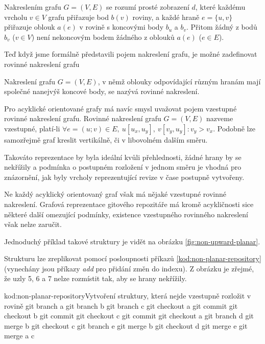 \documentclass[
  biblatex,
  glossaries,
  index
]{kidiplom}
\begin{document}
\begin{definition}
Nakreslením grafu $G=(V,E)$ se rozumí prosté zobrazení $d$, které každému vrcholu $v\in V$ grafu přiřazuje bod $b(v)$ roviny, a každé hraně $e=\{u,v\}$ přiřazuje oblouk $a(e)$ v rovině s koncovými body $b_u$ a $b_v$. Přitom žádný z bodů $b_v$ ($v\in V$) není
nekoncovým bodem žádného z oblouků $a(e)$ ($e\in E$).

Teď když jsme formálně představili pojem nakreslení grafu, je možné zadefinovat rovinné nakreslení grafu

\end{definition}
Nakreslení grafu $G = (V,E)$, v němž oblouky odpovídající různým hranám mají
společné nanejvýš koncové body, se nazývá rovinné nakreslení.
\begin{definition}

Pro acyklické orientované grafy má navíc smysl uvažovat pojem vzestupné rovinné nakreslení grafu. Rovinné nakreslení grafu $G=(V,E)$ nazveme vzestupné, platí-li $\forall e=(u; v)\in E,\ u[u_x,u_y],\ v[v_y,u_y]\colon v_y > v_x$. Podobně lze samozřejmě graf kreslit vertikálně, či v libovolném dalším směru.
\end{definition}

Takováto reprezentace by byla ideální kvůli přehlednosti, žádné hrany by se nekřížily a podmínka o postupném rozložení v jednom směru je vhodná pro znázornění, jak byly vrcholy reprezentující revize v čase postupně vytvořeny.

Ne každý acyklický orientovaný graf však má nějaké vzestupné rovinné nakreslení. Grafová reprezentace gitového repozitáře má kromě acykličnosti sice některé další omezující podmínky, existence vzestupného rovinného nakreslení však nelze zaručit.

Jednoduchý příklad takové struktury je vidět na obrázku \ref{fig:non-upward-planar}.

Strukturu lze zreplikovat pomocí posloupnosti příkazů \ref{kod:non-planar-repository} (vynechány jsou příkazy {\it add} pro přidání změn do indexu).
Z obrázku je zřejmé, že uzly 5, 6 a 7 nelze rozmístit tak, aby se hrany nekřížily.

\begin{kicode}{}{kod:non-planar-repository}{Vytvoření struktury, která nejde vzestupně rozložit v rovině}
git branch a
git branch b
git branch c
git checkout a
git commit
git checkout b
git commit
git checkout c
git commit
git checkout a
git branch d
git merge b
git checkout c
git branch e
git merge b
git checkout d
git merge e
git merge a c
\end{kicode}
\end{document}

